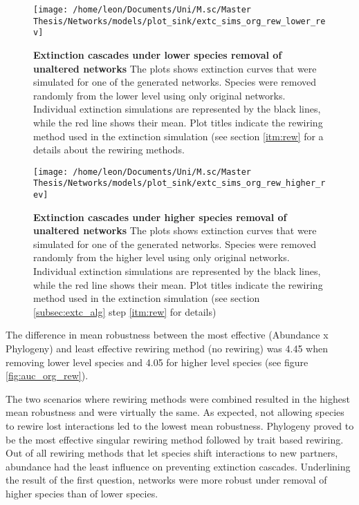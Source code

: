 \documentclass[12pt,a4paper]{article}
\begin{document}
\begin{figure}[H]
	 \centering
	 \texttt{[image: /home/leon/Documents/Uni/M.sc/Master Thesis/Networks/models/plot\_sink/extc\_sims\_org\_rew\_lower\_rev]}
	 \captionsetup{width = \textwidth}
	 \caption[Extinction cascades under lower species removal of unaltered networks]{\textbf{Extinction cascades under lower species removal of unaltered networks} The plots shows extinction curves that were simulated for one of the generated networks. Species were removed randomly from the lower level using only original networks. Individual extinction simulations are represented by the black lines, while the red line shows their mean. Plot titles indicate the rewiring method used in the extinction simulation (see section \ref{itm:rew} for a details about the rewiring methods.}
	 \label{fig:extc_org_rew_lower}
\end{figure}


\begin{figure}[H]
	 \centering
	 \texttt{[image: /home/leon/Documents/Uni/M.sc/Master Thesis/Networks/models/plot\_sink/extc\_sims\_org\_rew\_higher\_rev]}
	 \captionsetup{width = \textwidth}
	 \caption[Extinction cascades under higher species removal of unaltered networks]{\textbf{Extinction cascades under higher species removal of unaltered networks} The plots shows extinction curves that were simulated for one of the generated networks. Species were removed randomly from the higher level using only original networks. Individual extinction simulations are represented by the black lines, while the red line shows their mean. Plot titles indicate the rewiring method used in the extinction simulation (see section \ref{subsec:extc_alg} step \ref{itm:rew} for details)}
	 \label{fig:extc_org_rew_higher}
\end{figure}

The difference in mean robustness between the most effective (Abundance x Phylogeny) and least effective rewiring method (no rewiring) was 4.45 when removing lower level species and 4.05 for higher level species (see figure \ref{fig:auc_org_rew}). 

The two scenarios where rewiring methods were combined resulted in the highest mean robustness and were virtually the same. As expected, not allowing species to rewire lost interactions led to the lowest mean robustness. Phylogeny proved to be the most effective singular rewiring method followed by trait based rewiring. Out of all rewiring methods that let species shift interactions to new partners, abundance had the least influence on preventing extinction cascades. 
Underlining the result of the first question, networks were more robust under removal of higher species than of lower species. \par 
\end{document}
